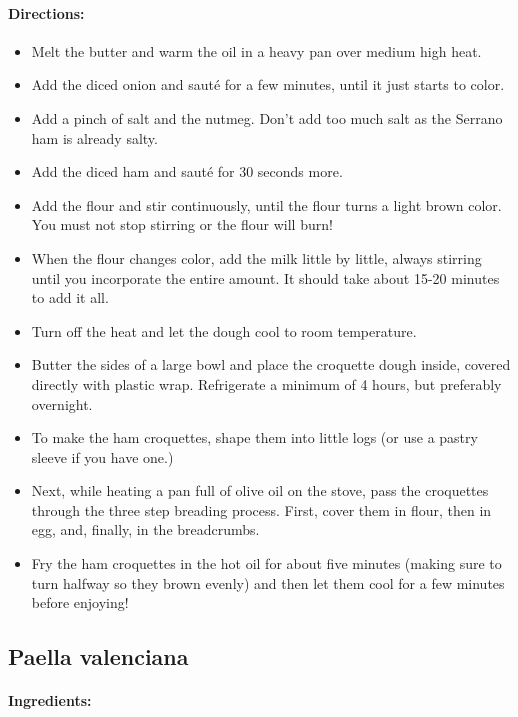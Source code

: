 \documentclass{article}
\begin{document}
\paragraph{Directions:}
\begin{itemize}
	\item Melt the butter and warm the oil in a heavy pan over medium high heat.
	\item Add the diced onion and sauté for a few minutes, until it just starts to color.
	\item Add a pinch of salt and the nutmeg. Don't add too much salt as the Serrano ham is already salty.
	\item Add the diced ham and sauté for 30 seconds more.
	\item Add the flour and stir continuously, until the flour turns a light brown color. You must not stop stirring or the flour will burn!
	\item When the flour changes color, add the milk little by little, always stirring until you incorporate the entire amount. It should take about 15-20 minutes to add it all.
	\item Turn off the heat and let the dough cool to room temperature.
	\item Butter the sides of a large bowl and place the croquette dough inside, covered directly with plastic wrap. Refrigerate a minimum of 4 hours, but preferably overnight.
	\item To make the ham croquettes, shape them into little logs (or use a pastry sleeve if you have one.)
	\item Next, while heating a pan full of olive oil on the stove, pass the croquettes through the three step breading process. First, cover them in flour, then in egg, and, finally, in the breadcrumbs.
	\item Fry the ham croquettes in the hot oil for about five minutes (making sure to turn halfway so they brown evenly) and then let them cool for a few minutes before enjoying!
\end{itemize}


\subsection{Paella valenciana}

\paragraph{Ingredients:}
\end{document}
